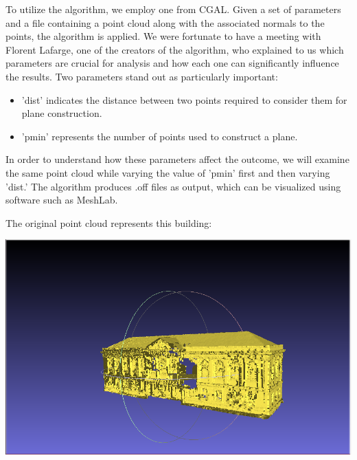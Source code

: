 \documentclass{article}
\begin{document}
\begin{itemize}
To utilize the algorithm, we employ one from CGAL. Given a set of parameters and a file containing a point cloud along with the associated normals to the points,
the algorithm is applied. We were fortunate to have a meeting with Florent Lafarge, one of the creators of the algorithm,
who explained to us which parameters are crucial for analysis and how each one can significantly influence the results.
Two parameters stand out as particularly important: 
\begin{itemize}
  \item 'dist' indicates the distance between two points required to consider them for plane construction.
  \item 'pmin' represents the number of points used to construct a plane.
\end{itemize}

In order to understand how these parameters affect the outcome, we will examine the same point cloud while varying the value of 'pmin' first and then varying 'dist.'
The algorithm produces .off files as output, which can be visualized using software such as MeshLab.

\newpage
The original point cloud represents this building:
\vspace{\baselineskip}

\begin{center}
    \includegraphics[scale=0.20]{../../images/screen_kinetic/building.png} 
\end{center}




\end{itemize}
\end{document}
